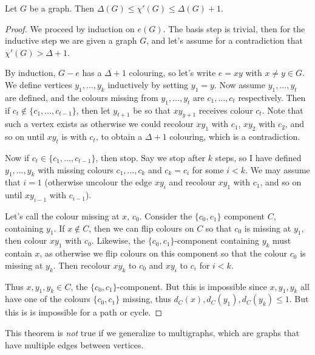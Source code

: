 \documentclass[a4paper]{scrreprt}
\begin{document}
\begin{theorem}
	Let $G$ be a graph. Then $\Delta(G) \leq \chi'(G) \leq \Delta(G) + 1$.
\end{theorem}
\begin{proof}
	We proceed by induction on $e(G)$. The basis step is trivial, then for the inductive step we are given a graph $G$, and let's assume for a contradiction that $\chi'(G) > \Delta + 1$.

	By induction, $G - e$ has a $\Delta + 1$ colouring, so let's write $e = xy$ with $x \neq y \in G$. We define vertices $y_1, \dots, y_k$ inductively by setting $y_1 = y$. Now assume $y_1, \dots, y_t$ are defined, and the colours missing from $y_1, \dots, y_t$ are $c_1, \dots, c_t$ respectively. Then if $c_t \not \in \{c_1, \dots, c_{t - 1}\}$, then let $y_{t + 1}$ be so that $xy_{y + 1}$ receives colour $c_t$.
	Note that such a vertex exists as otherwise we could recolour $xy_1$ with $c_1$, $xy_2$  with $c_2$, and so on until $x y_t$ is with $c_t$, to obtain a $\Delta + 1$ colouring, which is a  contradiction.

	Now if $c_t \in \{c_1, \dots, c_{t - 1}\}$, then stop. Say we stop after $k$ steps, so I have defined $y_1, \dots, y_k$ with missing colours $c_1, \dots, c_k$ and $c_k = c_i$ for some $i < k$. We may assume that $i = 1$ (otherwise uncolour the edge $xy_i$ and recolour $xy_1$ with $c_1$, and so on until $xy_{i - 1}$ with $c_{i - 1}$).

	Let's call the colour missing at $x$, $c_0$. Consider the $\{c_0, c_1\}$ component $C$, containing $y_1$. If $x \not \in C$, then we can flip colours on $C$ so that $c_0$ is missing at $y_1$, then colour $xy_1$ with $c_0$. Likewise, the $\{c_0, c_1\}$-component containing $y_k$ must contain $x$, as otherwise we flip colours on this component so that the colour $c_0$ is missing at $y_k$. Then recolour $xy_k$ to $c_0$ and $xy_i$ to $c_i$ for $i < k$.

	Thus $x, y_1, y_k \in C$, the $\{c_0, c_1\}$-component. But this is impossible since $x, y_1, y_k$ all have one of the colours $\{c_0, c_1\}$ missing, thus $d_C(x), d_C(y_1), d_C(y_k) \leq 1$. But this is is impossible for a path or cycle.
\end{proof}

\begin{remark}
	This theorem is \emph{not} true if we generalize to multigraphs, which are graphs that have multiple edges between vertices.
\end{remark}
\end{document}
